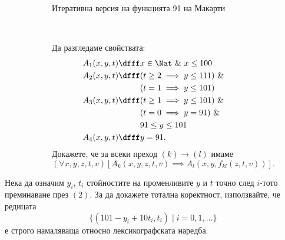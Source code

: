 \begin{figure}[H]
\begin{subfigure}[b]{0.6\textwidth}
  \caption{Итеративна версия на функцията 91 на Макарти}
  \label{fig:gcd}
  \end{subfigure}
  ~
  \begin{subfigure}[b]{0.6\textwidth}
    \footnotesize{
      Да разгледаме свойствата:
      \begin{align*}
        A_1(x,y,t) \dfff & x \in \Nat\ \&\ x \leq 100\\
        A_2(x,y,t) \dfff & (t \geq 2 \implies y \leq 111)\ \&\\
                         & (t = 1 \implies y \leq 101)\\
        A_3(x,y,t) \dfff & (t \geq 1 \implies y \leq 101)\ \&\\
                         & (t = 0 \implies y = 91)\ \& \\
        & 91 \leq y \leq 101\\
        A_4(x,y,t) \dfff & y = 91.
      \end{align*}
      Докажете, че за всеки преход $(k) \to (l)$ имаме
      \[(\forall x,y,z,t,v)[A_k(x,y,z,t,v) \implies A_l(x,y,f_{kl}(z,t,v))].\]
    }
  \end{subfigure}
\end{figure}

Нека да означим $y_i$, $t_i$ стойностите на променливите $y$ и $t$ точно след $i$-тото преминаване през $(2)$.
За да докажете тотална коректност, използвайте, че редицата
\[\{(101 - y_i + 10t_i, t_i) \mid i = 0,1,\dots\}\]
е строго намаляваща относно лексикографската наредба.


